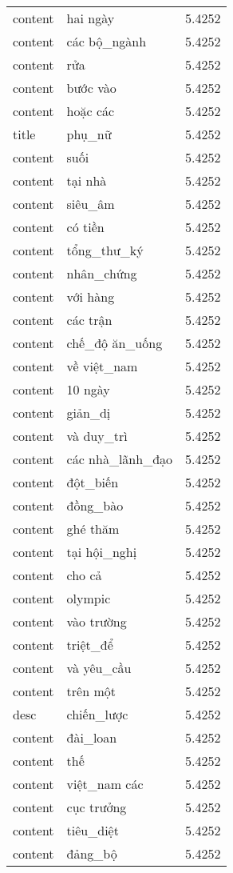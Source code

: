 \documentclass{article}
\begin{document}
\begin{tabular}{lll}
content & hai ngày & 5.4252\\
content & các bộ\_ngành & 5.4252\\
content & rửa & 5.4252\\
content & bước vào & 5.4252\\
content & hoặc các & 5.4252\\
title & phụ\_nữ & 5.4252\\
content & suối & 5.4252\\
content & tại nhà & 5.4252\\
content & siêu\_âm & 5.4252\\
content & có tiền & 5.4252\\
content & tổng\_thư\_ký & 5.4252\\
content & nhân\_chứng & 5.4252\\
content & với hàng & 5.4252\\
content & các trận & 5.4252\\
content & chế\_độ ăn\_uống & 5.4252\\
content & về việt\_nam & 5.4252\\
content & 10 ngày & 5.4252\\
content & giản\_dị & 5.4252\\
content & và duy\_trì & 5.4252\\
content & các nhà\_lãnh\_đạo & 5.4252\\
content & đột\_biến & 5.4252\\
content & đồng\_bào & 5.4252\\
content & ghé thăm & 5.4252\\
content & tại hội\_nghị & 5.4252\\
content & cho cả & 5.4252\\
content & olympic & 5.4252\\
content & vào trường & 5.4252\\
content & triệt\_để & 5.4252\\
content & và yêu\_cầu & 5.4252\\
content & trên một & 5.4252\\
desc & chiến\_lược & 5.4252\\
content & đài\_loan & 5.4252\\
content & thế & 5.4252\\
content & việt\_nam các & 5.4252\\
content & cục trưởng & 5.4252\\
content & tiêu\_diệt & 5.4252\\
content & đảng\_bộ & 5.4252\\

\end{tabular}
\end{document}
